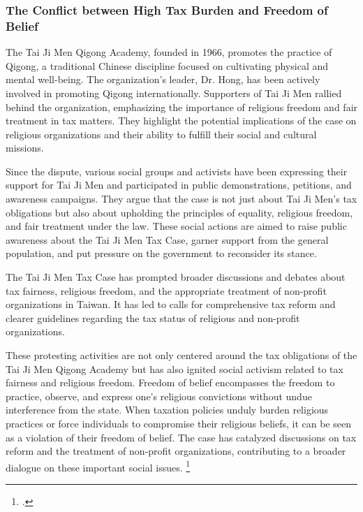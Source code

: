 \documentclass[]{article}
\begin{document}
\subsubsection{The Conflict between High Tax Burden and Freedom of Belief}

The Tai Ji Men Qigong Academy, founded in 1966, promotes the practice of Qigong, a traditional Chinese discipline focused on cultivating physical and mental well-being. The organization's leader, Dr. Hong, has been actively involved in promoting Qigong internationally.
Supporters of Tai Ji Men rallied behind the organization, emphasizing the importance of religious freedom and fair treatment in tax matters. They highlight the potential implications of the case on religious organizations and their ability to fulfill their social and cultural missions.

Since the dispute, various social groups and activists have been expressing their support for Tai Ji Men and participated in public demonstrations, petitions, and awareness campaigns. They argue that the case is not just about Tai Ji Men's tax obligations but also about upholding the principles of equality, religious freedom, and fair treatment under the law.
These social actions are aimed to raise public awareness about the Tai Ji Men Tax Case, garner support from the general population, and put pressure on the government to reconsider its stance. 


The Tai Ji Men Tax Case has prompted broader discussions and debates about tax fairness, religious freedom, and the appropriate treatment of non-profit organizations in Taiwan. It has led to calls for comprehensive tax reform and clearer guidelines regarding the tax status of religious and non-profit organizations.

These protesting activities are not only centered around the tax obligations of the Tai Ji Men Qigong Academy but has also ignited social activism related to tax fairness and religious freedom. Freedom of belief encompasses the freedom to practice, observe, and express one's religious convictions without undue interference from the state. When taxation policies unduly burden religious practices or force individuals to compromise their religious beliefs, it can be seen as a violation of their freedom of belief. The case has catalyzed discussions on tax reform and the treatment of non-profit organizations, contributing to a broader dialogue on these important social issues. \footcite{Jacobsen2020}
\end{document}
